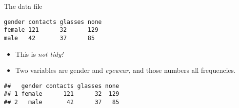 \begin{frame}[fragile]{The data file}
  
\begin{verbatim}
gender contacts glasses none
female 121      32      129
male   42       37      85
\end{verbatim}
  
  \begin{itemize}
  \item This is \emph{not tidy!}
  \item Two variables are gender and \emph{eyewear}, and those numbers
    all frequencies.
  \end{itemize}

\begin{knitrout}
\color{fgcolor}\begin{kframe}
\begin{alltt}
\hlkwb{=}\hlstd{(}\hlstd{,}
\end{alltt}
\begin{verbatim}
##   gender contacts glasses none
## 1 female      121      32  129
## 2   male       42      37   85
\end{verbatim}
\begin{alltt}
\hlstd{(}
\end{alltt}
\end{kframe}
\end{knitrout}
  
\end{frame}

